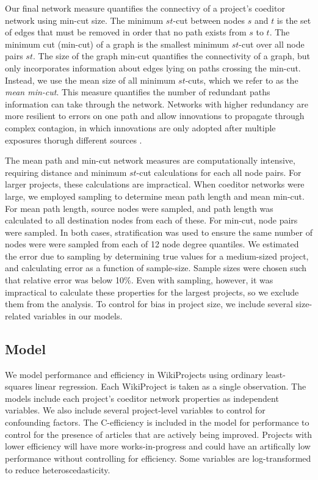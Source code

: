 \documentclass[10pt,twocolumn]{article}
\newcommand{\+}{\phantom{-}}
\begin{document}
Our final network measure quantifies the connectivy of a project's coeditor network using
min-cut size.
The minimum $st$-cut between nodes $s$ and $t$ is the set of edges that must be removed in order that
no path exists from $s$ to $t$.
The minimum cut (min-cut) of a graph is the smallest minimum $st$-cut over all node pairs $st$. 
The size of the graph min-cut quantifies the connectivity of a graph,
but only incorporates information about edges lying on paths crossing the min-cut.
Instead, we use the mean size of all minimum $st$-cuts, which we refer to as the
{\em mean min-cut}.
This measure quantifies the number of redundant paths information can take through the network.
Networks with higher redundancy are more resilient to errors on one path \cite{albert_error_2000}
and allow innovations to propagate through complex contagion,
in which innovations are only adopted after multiple exposures thorugh different sources
\cite{centola_complex_2007}.

The mean path and min-cut network measures are computationally intensive,
requiring distance and minimum $st$-cut calculations for each all node pairs.
For larger projects, these calculations are impractical.
When coeditor networks were large, we employed sampling to determine mean path length and mean
min-cut.
For mean path length, source nodes were sampled, and path length was calculated to all destination nodes
from each of these.
For min-cut, node pairs were sampled.
In both cases, stratification was used to ensure the same number of nodes were were sampled from each of
12 node degree quantiles.
We estimated the error due to sampling by determining true values for a medium-sized project,
and calculating error as a function of sample-size.
Sample sizes were chosen such that relative error was below 10\%.
Even with sampling, however, it was impractical to calculate these properties for the largest projects,
so we exclude them from the analysis.
To control for bias in project size, we include several size-related variables in our models.

\subsection{Model}

We model performance and efficiency in WikiProjects using ordinary least-squares linear regression.
Each WikiProject is taken as a single observation.
The models include each project's coeditor network properties as independent variables.
We also include several project-level variables to control for confounding factors.
The C-efficiency is included in the model for performance to control for the presence of articles
that are actively being improved.
Projects with lower efficiency will have more works-in-progress and could have an artifically low
performance without controlling for efficiency.
Some variables are log-transformed to reduce heteroscedasticity.
\end{document}
